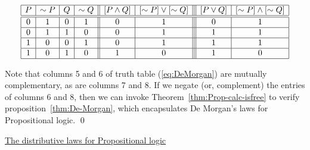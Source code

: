 \begin{equation}
\label{eq:DeMorgan}
\begin{array}{|c|c|c|c||c|c|||c|c|}
\hline
P & \sim P & Q & \sim Q 
  & [ P \wedge Q ]
  & [\sim P] \vee [\sim Q]
  & [ P \vee Q ]
  & [\sim P] \wedge [\sim Q] \\
\hline
\hline
0 & 1 & 0 & 1
  & 0
  & 1
  & 0
  & 1 \\
\hline
0 & 1 & 1 & 0
  & 0
  & 1
  & 1
  & 1 \\
\hline
1 & 0 & 0 & 1
  & 0
  & 1
  & 1
  & 1 \\
\hline
1 & 0 & 1 & 0
  & 1
  & 0
  & 1
  & 0 \\
\hline
\end{array}
\end{equation}

Note that columns 5 and 6 of truth table (\ref{eq:DeMorgan}) are
mutually complementary, as are columns 7 and 8.  If we negate (or,
complement) the entries of columns 6 and 8, then we can invoke
Theorem~\ref{thm:Prop-calc-isfree} to verify
proposition~\ref{thm:De-Morgan}, which encapsulates De Morgan's laws
for Propositional logic.  \qed

\medskip

\noindent 
\underline{\small\sf The distributive laws for Propositional
  logic}


